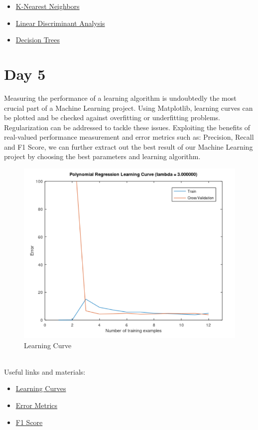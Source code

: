 \documentclass[11pt]{article}
\begin{document}
\begin{itemize}
\item \href{https://www.youtube.com/watch?v=HVXime0nQeI}{K-Nearest Neighbors}
\item \href{https://www.youtube.com/watch?v=azXCzI57Yfc}{Linear Discriminant Analysis}
\item \href{https://www.youtube.com/watch?v=7VeUPuFGJHk}{Decision Trees}
\end{itemize}
\section{Day 5}
Measuring the performance of a learning algorithm is undoubtedly the most crucial part of a Machine Learning project. Using Matplotlib, learning curves can be plotted and be checked against overfitting or underfitting problems. Regularization can be addressed to tackle these issues. Exploiting the benefits of real-valued performance measurement and error metrics such as: Precision, Recall and F1 Score, we can further extract out the best result of our Machine Learning project by choosing the best parameters and learning algorithm.
\begin{figure}[h!]
\begin{center}
\includegraphics[scale=.8]{img/lc.png}
{\caption*{Learning Curve}}
\end{center}
\end{figure}\\
Useful links and materials:
\begin{itemize}
\item \href{https://www.youtube.com/watch?v=ISBGFY-gBug}{Learning Curves}
\item \href{https://www.youtube.com/watch?v=wGw6R8AbcuI}{Error Metrics}
\item \href{https://www.youtube.com/watch?v=W5meQnGACGo}{F1 Score}
\end{itemize}
\pagebreak
\end{document}
